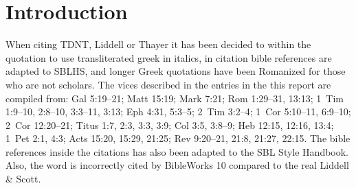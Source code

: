 \documentclass[a4paper,twocolumn,twoside,notitlepage,10pt]{article}
\begin{document}
\section{Introduction}

When citing TDNT, Liddell or Thayer it has been decided to within the quotation to use transliterated greek in italics, in citation bible references are adapted to SBLHS, and longer Greek quotations have been Romanized for those who are not scholars. The vices described in the entries in the this report are compiled from: Gal 5:19--21; Matt 15:19; Mark 7:21; Rom 1:29--31, 13:13; 1~Tim 1:9--10, 2:8--10, 3:3--11, 3:13; Eph 4:31, 5:3--5; 2~Tim 3:2--4; 1~Cor 5:10--11, 6:9--10; 2~Cor 12:20--21; Titus 1:7, 2:3, 3:3, 3:9; Col 3:5, 3:8--9; Heb 12:15, 12:16, 13:4; 1~Pet 2:1, 4:3; Acts 15:20, 15:29, 21:25; Rev 9:20--21, 21:8, 21:27, 22:15.
The bible references inside the citations has also been adapted to the SBL Style Handbook.
 Also, the word  is incorrectly cited by BibleWorks 10 compared to the real Liddell \& Scott.
\end{document}
